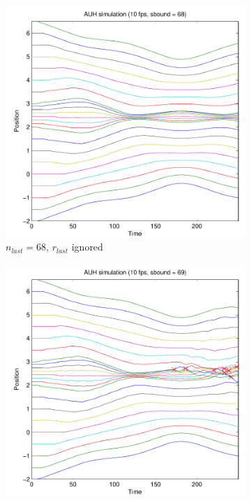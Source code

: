 \documentclass[11pt]{article}
\begin{document}
\begin{figure}[H]
\begin{subfigure}[t]{0.5\textwidth}
        \includegraphics[width=\textwidth]{../images/atomic_multiscale_10fps_68sbound.pdf}
        \caption{$n_{last} = 68$, $r_{last}$ ignored}
        \label{fig:atomic_multi_68sbound}
    \end{subfigure}
    \begin{subfigure}[t]{0.5\textwidth}
        \includegraphics[width=\textwidth]{../images/atomic_multiscale_10fps_69sbound.pdf}

\end{subfigure}
\end{figure}
\end{document}
